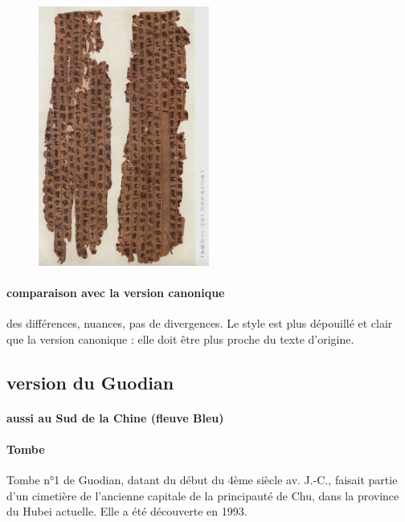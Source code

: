  \begin{figure}[!h]
    \centering
    \includegraphics[width=0.5\textwidth]{ConfucianismeTaoismeBouddhismeChinois/Images/Laozitexte.png}

    \label{fig:enter-label}
\end{figure}
\paragraph{comparaison avec la version canonique} des différences, nuances, pas de divergences. Le style est plus dépouillé et clair que la version canonique : elle doit être plus proche du texte d'origine. 


 \subsection{version du Guodian}

 \paragraph{aussi au Sud de la Chine (fleuve Bleu)}

 \paragraph{Tombe}
Tombe n°1 de Guodian, datant du début du 4ème siècle av. J.-C., faisait partie d’un cimetière de l’ancienne capitale de la principauté de Chu, dans la province du Hubei actuelle. Elle a été découverte en 1993.

